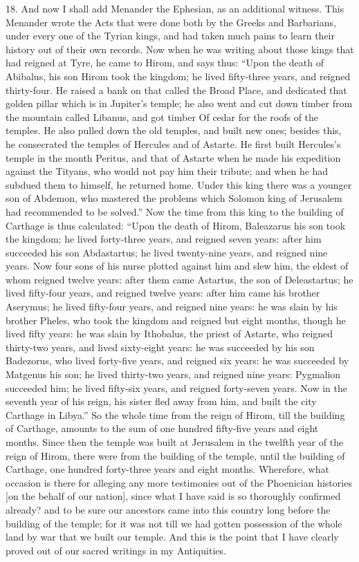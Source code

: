 18. And now I shall add Menander the Ephesian, as an additional witness.
This Menander wrote the Acts that were done both by the Greeks and
Barbarians, under every one of the Tyrian kings, and had taken much pains
to learn their history out of their own records. Now when he was writing
about those kings that had reigned at Tyre, he came to Hirom, and says
thus: ``Upon the death of Abibalus, his son Hirom took the kingdom; he
lived fifty-three years, and reigned thirty-four. He raised a bank on that
called the Broad Place, and dedicated that golden pillar which is in
Jupiter's temple; he also went and cut down timber from the mountain
called Libanus, and got timber Of cedar for the roofs of the temples. He
also pulled down the old temples, and built new ones; besides this, he
consecrated the temples of Hercules and of Astarte. He first built
Hercules's temple in the month Peritus, and that of Astarte when he made
his expedition against the Tityans, who would not pay him their tribute;
and when he had subdued them to himself, he returned home. Under this king
there was a younger son of Abdemon, who mastered the problems which
Solomon king of Jerusalem had recommended to be solved.'' Now the time from
this king to the building of Carthage is thus calculated: ``Upon the death
of Hirom, Baleazarus his son took the kingdom; he lived forty-three years,
and reigned seven years: after him succeeded his son Abdastartus; he lived
twenty-nine years, and reigned nine years. Now four sons of his nurse
plotted against him and slew him, the eldest of whom reigned twelve years:
after them came Astartus, the son of Deleastartus; he lived fifty-four
years, and reigned twelve years: after him came his brother Aserymus; he
lived fifty-four years, and reigned nine years: he was slain by his
brother Pheles, who took the kingdom and reigned but eight months, though
he lived fifty years: he was slain by Ithobalus, the priest of Astarte,
who reigned thirty-two years, and lived sixty-eight years: he was
succeeded by his son Badezorus, who lived forty-five years, and reigned
six years: he was succeeded by Matgenus his son; he lived thirty-two
years, and reigned nine years: Pygmalion succeeded him; he lived fifty-six
years, and reigned forty-seven years. Now in the seventh year of his
reign, his sister fled away from him, and built the city Carthage in
Libya.'' So the whole time from the reign of Hirom, till the building of
Carthage, amounts to the sum of one hundred fifty-five years and eight
months. Since then the temple was built at Jerusalem in the twelfth year
of the reign of Hirom, there were from the building of the temple, until
the building of Carthage, one hundred forty-three years and eight months.
Wherefore, what occasion is there for alleging any more testimonies out of
the Phoenician histories [on the behalf of our nation], since what I have
said is so thoroughly confirmed already? and to be sure our ancestors came
into this country long before the building of the temple; for it was not
till we had gotten possession of the whole land by war that we built our
temple. And this is the point that I have clearly proved out of our sacred
writings in my Antiquities.

